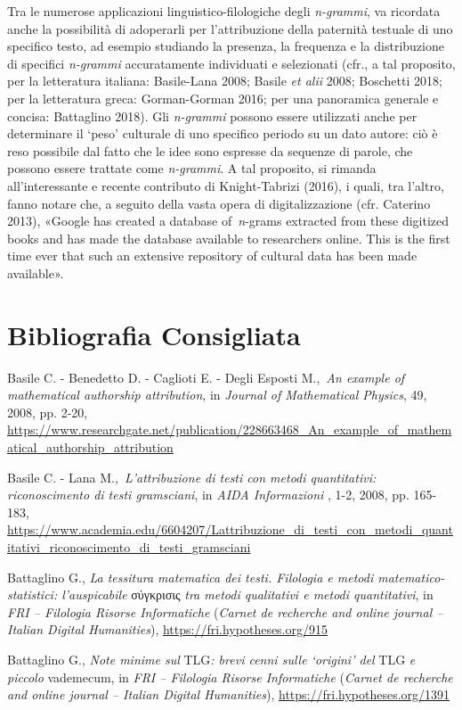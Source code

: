 {Tra le numerose applicazioni linguistico-filologiche degli
\emph{n-grammi}, va ricordata anche la possibilità di adoperarli per
l'attribuzione della paternità testuale di uno specifico testo, ad
esempio studiando la presenza, la frequenza e la distribuzione di
specifici \emph{n-grammi} accuratamente individuati e selezionati (cfr.,
a tal proposito, per la letteratura italiana: Basile-Lana 2008; Basile
\emph{et alii} 2008; Boschetti 2018; per la letteratura greca:
Gorman-Gorman 2016; per una panoramica generale e concisa: Battaglino
2018). Gli \emph{n-grammi} possono essere utilizzati anche per
determinare il `peso' culturale di uno specifico periodo su un dato
autore: ciò è reso possibile dal fatto che le idee sono espresse da
sequenze di parole, che possono essere trattate come \emph{n-grammi}. A
tal proposito, si rimanda all'interessante e recente contributo di
Knight-Tabrizi (2016), i quali, tra l'altro, fanno notare che, a seguito
della vasta opera di digitalizzazione (cfr. Caterino 2013), «Google has
created a database of~\emph{n}-grams extracted from these digitized
books and has made the database available to researchers online. This is
the first time ever that such an extensive repository of cultural data
has been made available».

\section*{Bibliografia Consigliata}
{\parindent0pt 
Basile C. - Benedetto D. - Caglioti E. - Degli Esposti M.,~\emph{An
example of mathematical authorship attribution}, in \emph{Journal of
Mathematical Physics}, 49, 2008, pp. 2-20,
\url{https://www.researchgate.net/publication/228663468_An_example_of_mathematical_authorship_attribution}

Basile C. - Lana M.,~\emph{L'attribuzione di testi con metodi
quantitativi: riconoscimento di testi gramsciani}, in \emph{AIDA
Informazioni} , 1-2, 2008, pp. 165-183,
\url{https://www.academia.edu/6604207/Lattribuzione_di_testi_con_metodi_quantitativi_riconoscimento_di_testi_gramsciani}

Battaglino G., \emph{La tessitura matematica dei testi. Filologia e
metodi matematico-statistici: l'auspicabile} σύγκρισις \emph{tra metodi
qualitativi e metodi quantitativi}, in \emph{FRI -- Filologia Risorse
Informatiche} (\emph{Carnet de recherche and online journal -- Italian
Digital Humanities}),
\url{https://fri.hypotheses.org/915}

Battaglino G., \emph{Note minime sul} TLG\emph{: brevi cenni sulle
`origini' del} TLG \emph{e piccolo} vademecum, in \emph{FRI -- Filologia
Risorse Informatiche} (\emph{Carnet de recherche and online journal --
Italian Digital Humanities}),
\url{https://fri.hypotheses.org/1391}

}}
